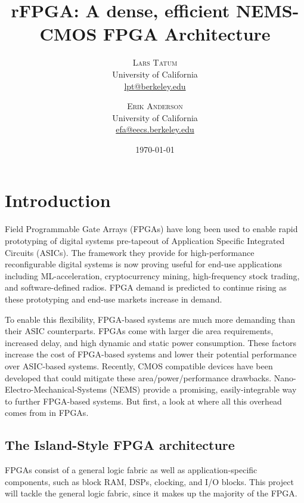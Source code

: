 \documentclass[twoside,twocolumn]{article}
\title{rFPGA: A dense, efficient NEMS-CMOS FPGA Architecture} %
\author{%
\textsc{Lars Tatum}\\[1ex] %
\normalsize University of California \\ %
\normalsize \href{mailto:lpt@berkeley.edu}{lpt@berkeley.edu} %
\and %
\textsc{Erik Anderson}\\[1ex] %
\normalsize University of California \\ %
\normalsize \href{mailto:efa@eecs.berkeley.edu}{efa@eecs.berkeley.edu} %
}
\date{\today} %
\begin{document}
\maketitle


\section{Introduction}

Field Programmable Gate Arrays (FPGAs) have long been used to enable rapid prototyping of digital systems pre-tapeout of Application Specific Integrated Circuits (ASICs)\cite{8187326}. The framework they provide for high-performance reconfigurable digital systems is now proving useful for end-use applications including ML-acceleration, cryptocurrency mining, high-frequency stock trading, and software-defined radios. FPGA demand is predicted to continue rising as these prototyping and end-use markets increase in demand.

To enable this flexibility, FPGA-based systems are much more demanding than their ASIC counterparts. FPGAs come with larger die area requirements, increased delay, and high dynamic and static power consumption. These factors increase the cost of FPGA-based systems and lower their potential performance over ASIC-based systems. Recently, CMOS compatible devices have been developed that could mitigate these area/power/performance drawbacks.  Nano-Electro-Mechanical-Systems (NEMS) provide a promising, easily-integrable way to further FPGA-based systems. But first, a look at where all this overhead comes from in FPGAs.

\subsection{The Island-Style FPGA architecture}

FPGAs consist of a general logic fabric as well as application-specific components, such as block RAM, DSPs, clocking, and I/O blocks\cite{8187326}. This project will tackle the general logic fabric, since it makes up the majority of the FPGA.
\end{document}

